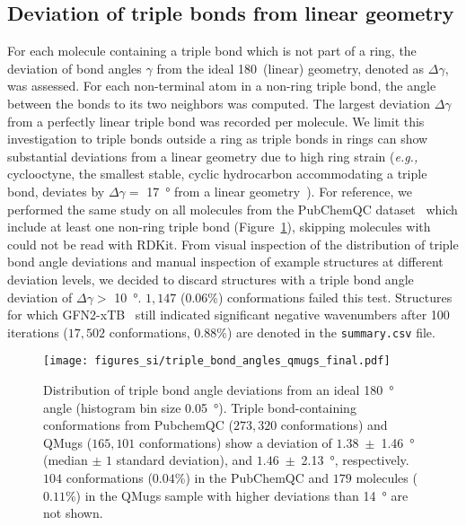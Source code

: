 \subsection{Deviation of triple bonds from linear geometry}
For each molecule containing a triple bond which is not part of a ring, the deviation of bond angles $\gamma$ from the ideal 180\textdegree ~(linear) geometry, denoted as $\Delta \gamma$, was assessed. For each non-terminal atom in a non-ring triple bond, the angle between the bonds to its two neighbors was computed. The largest deviation $\Delta \gamma$ from a perfectly linear triple bond was recorded per molecule. We limit this investigation to triple bonds outside a ring as triple bonds in rings can show substantial deviations from a linear geometry due to high ring strain (\textit{e.g.,} cyclooctyne, the smallest stable, cyclic hydrocarbon accommodating a triple bond, deviates by $\Delta \gamma =$ \SI{17}{\degree} from a linear geometry~\cite{bach2009ring}). For reference, we performed the same study on all molecules from the PubChemQC dataset~\cite{nakata2017pubchemqc} which include at least one non-ring triple bond (Figure~\ref{fig:linear_triple_bonds}), skipping molecules with could not be read with RDKit. From visual inspection of the distribution of triple bond angle deviations and manual inspection of example structures at different deviation levels, we decided to discard structures with a triple bond angle deviation of $\Delta \gamma >$ \SI{10}{\degree}. $1,147$ ($0.06$\%) conformations failed this test. Structures for which GFN2-xTB~\cite{grimme2017robust, bannwarth2019gfn2, grimme2019exploration, bannwarth2020extended} still indicated significant negative wavenumbers after 100 iterations ($17,502$ conformations, $0.88$\%) are denoted in the \texttt{summary.csv} file.

\begin{figure}[H]
\centering
\texttt{[image: figures\_si/triple\_bond\_angles\_qmugs\_final.pdf]}
\caption{Distribution of triple bond angle deviations from an ideal \SI{180}{\degree} angle (histogram bin size \SI{0.05}{\degree}). Triple bond-containing conformations from PubchemQC ($273,320$ conformations) and QMugs ($165,101$ conformations) show a deviation of $1.38$~$\pm$~\SI{1.46}{\degree} (median $\pm$ $1$ standard deviation), and $1.46$~$\pm$~\SI{2.13}{\degree}, respectively. $104$ conformations ($0.04$\%) in the PubChemQC and $179$ molecules ($0.11$\%) in the QMugs sample with higher deviations than \SI{14}{\degree} are not shown.} 
\label{fig:linear_triple_bonds}
\end{figure}
\noindent

